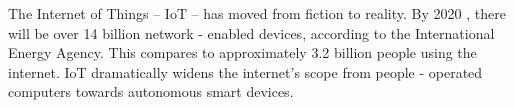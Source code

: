 The Internet of Things – IoT – has moved from fiction to reality.  By 2020 ,
there will be over 14 billion  network - enabled  devices,  according  to  the
International  Energy  Agency.  This  compares  to approximately 3.2 billion
people using the internet. IoT dramatically widens the internet’s scope from
people - operated computers towards autonomous smart devices. 
